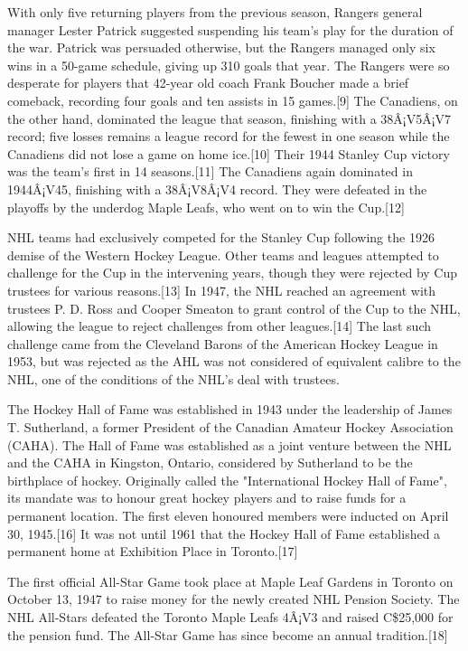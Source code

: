 \documentclass[conference]{IEEEtran}
\begin{document}
With only five returning players from the previous season, Rangers
general manager Lester Patrick suggested suspending his team's play
for the duration of the war. Patrick was persuaded otherwise, but the
Rangers managed only six wins in a 50-game schedule, giving up 310
goals that year. The Rangers were so desperate for players that
42-year old coach Frank Boucher made a brief comeback, recording four
goals and ten assists in 15 games.[9] The Canadiens, on the other
hand, dominated the league that season, finishing with a 38Â¡V5Â¡V7
record; five losses remains a league record for the fewest in one
season while the Canadiens did not lose a game on home ice.[10] Their
1944 Stanley Cup victory was the team's first in 14 seasons.[11] The
Canadiens again dominated in 1944Â¡V45, finishing with a 38Â¡V8Â¡V4
record. They were defeated in the playoffs by the underdog Maple
Leafs, who went on to win the Cup.[12]

NHL teams had exclusively competed for the Stanley Cup following the
1926 demise of the Western Hockey League. Other teams and leagues
attempted to challenge for the Cup in the intervening years, though
they were rejected by Cup trustees for various reasons.[13] In 1947,
the NHL reached an agreement with trustees P. D. Ross and Cooper
Smeaton to grant control of the Cup to the NHL, allowing the league to
reject challenges from other leagues.[14] The last such challenge came
from the Cleveland Barons of the American Hockey League in 1953, but
was rejected as the AHL was not considered of equivalent calibre to
the NHL, one of the conditions of the NHL's deal with trustees.

The Hockey Hall of Fame was established in 1943 under the leadership
of James T. Sutherland, a former President of the Canadian Amateur
Hockey Association (CAHA). The Hall of Fame was established as a joint
venture between the NHL and the CAHA in Kingston, Ontario, considered
by Sutherland to be the birthplace of hockey. Originally called the
"International Hockey Hall of Fame", its mandate was to honour great
hockey players and to raise funds for a permanent location. The first
eleven honoured members were inducted on April 30, 1945.[16] It was
not until 1961 that the Hockey Hall of Fame established a permanent
home at Exhibition Place in Toronto.[17]

The first official All-Star Game took place at Maple Leaf Gardens in
Toronto on October 13, 1947 to raise money for the newly created NHL
Pension Society. The NHL All-Stars defeated the Toronto Maple Leafs
4Â¡V3 and raised C\$25,000 for the pension fund. The All-Star Game has
since become an annual tradition.[18]
\end{document}

